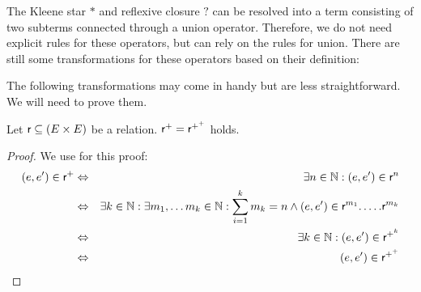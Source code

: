 \documentclass[a4paper,twoside,12pt, english]{article}
\begin{document}
The Kleene star $*$ and reflexive closure $?$ can be resolved into a term consisting of two subterms connected through a union operator. Therefore, we do not need explicit rules for these operators, but can rely on the rules for union. 
There are still some transformations for these operators based on their definition:
\pagebreak
The following transformations may come in handy but are less straightforward. We will need to prove them. 
\begin{lemma}\label{lem:++}
Let $\textsf{\upshape r} \subseteq (E \times E)$ be a relation. $\textsf{\upshape r}^+ = \textsf{\upshape r}^{+^+}$ holds.
\end{lemma}
\begin{proof} We use  for this proof:
\begin{eqnarray*}
(e,e') \in  \textsf{\upshape r}^+ &\Leftrightarrow & \exists n \in \mathbb{N}: (e,e') \in  \textsf{\upshape r}^n \\
&\Leftrightarrow & \exists k \in \mathbb{N}: \exists m_1,\dots m_k \in \mathbb{N}: \sum_{i=1}^k m_k = n \land (e,e') \in  \textsf{\upshape r}^{m_1}.\dots.\textsf{\upshape r}^{m_k}\\
&\Leftrightarrow & \exists k \in \mathbb{N}: (e,e') \in  \textsf{\upshape r}^{+^k} \\
&\Leftrightarrow & (e,e') \in  \textsf{\upshape r}^{+^+}
\end{eqnarray*}

\end{proof}
\end{document}
